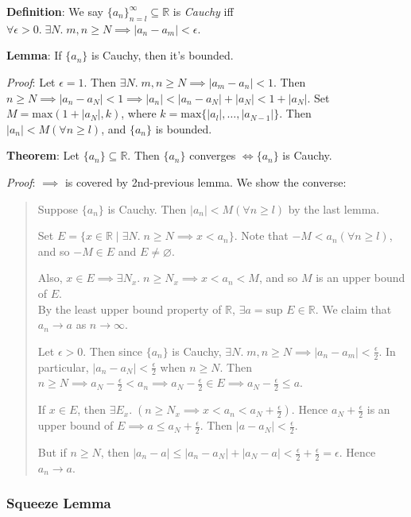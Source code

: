 \documentclass[11pt]{article}
\begin{document}
\textbf{Definition}: We say $\{a_n\}_{n=l}^\infty \subseteq \mathbb{R}$ is \emph{Cauchy} iff $\forall \epsilon > 0.\; \exists N.\; m,n \geq N \implies |a_n - a_m| < \epsilon$.

\textbf{Lemma}: If $\{a_n\}$ is Cauchy, then it's bounded.

\emph{Proof}: Let $\epsilon = 1$. Then $\exists N.\; m,n \geq N \implies |a_m - a_n| < 1$. Then $n \geq N \implies |a_n - a_N| < 1 \implies |a_n| < |a_n - a_N| + |a_N| < 1 + |a_N|$. Set $M = \text{max}(1+ |a_N|, k)$, where $k = \text{max}\{|a_l|, \ldots, |a_{N-1}|\}$. Then $|a_n| < M (\forall n \geq l)$, and $\{a_n\}$ is bounded.

\textbf{Theorem}: Let $\{a_n\} \subseteq \mathbb{R}$. Then $\{a_n\}$ converges $\iff \{a_n\}$ is Cauchy.

\emph{Proof}: $\implies$ is covered by 2nd-previous lemma. We show the converse:
\begin{quote}\vspace{-0.3cm}
Suppose $\{a_n\}$ is Cauchy. Then $|a_n| < M (\forall n \geq l)$ by the last lemma.

Set $E = \{x \in \mathbb{R} \;|\; \exists N.\; n \geq N \implies x < a_n\}$. Note that $-M < a_n (\forall n \geq l)$, and so $-M \in E$ and $E \neq \varnothing$.

Also, $x \in E \implies \exists N_x.\; n \geq N_x \implies x < a_n < M$, and so $M$ is an upper bound of $E$.\\
By the least upper bound property of $\mathbb{R}$, $\exists a = \text{sup } E \in \mathbb{R}$. We claim that $a_n \to a$ as $n \to \infty$.

Let $\epsilon > 0$. Then since $\{a_n\}$ is Cauchy, $\exists N.\; m,n \geq N \implies |a_n - a_m| < \frac{\epsilon}{2}$. In particular, $|a_n - a_N| < \frac{\epsilon}{2}$ when $n \geq N$. Then $n \geq N \implies a_N - \frac{\epsilon}{2} < a_n \implies a_N - \frac{\epsilon}{2} \in E \implies a_N - \frac{\epsilon}{2} \leq a$.

If $x \in E$, then $\exists E_x.\; (n \geq N_x \implies x < a_n < a_N + \frac{\epsilon}{2})$. Hence $a_N + \frac{\epsilon}{2}$ is an upper bound of $E \implies a \leq a_N + \frac{\epsilon}{2}$. Then $|a - a_N| < \frac{\epsilon}{2}$.

But if $n \geq N$, then $|a_n - a| \leq |a_n - a_N| + |a_N - a| < \frac{\epsilon}{2} + \frac{\epsilon}{2} = \epsilon$. Hence $a_n \to a$.
\end{quote}

\subsubsection{Squeeze Lemma}
\end{document}
